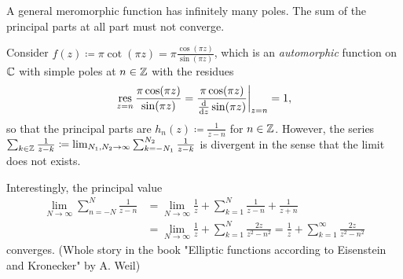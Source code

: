 \documentclass[a4paper,english]{article}
\begin{document}
A general meromorphic function has infinitely many poles.
The sum of the principal parts at all part must not converge.

\begin{exampleB}
    Consider $f(z) \coloneqq \pi \cot(\pi z) = \pi \frac{\cos(\pi z)}{\sin(\pi z)}$, which is an \emph{automorphic} function on $\operatorname{\mathbb{C}}$ with simple poles at $n \in \operatorname{\mathbb{Z}}$ with the residues
    \begin{equation*}
        \operatorname*{res}_{z = n} \frac{\pi \cos(\pi z)}{\sin(\pi z)}
        = \frac{\pi \cos(\pi z)}{\frac{\mathop{}\!\mathrm{d}}{\mathop{}\!\mathrm{d}{z}}\sin(\pi z)}\bigg|_{z = n}
        = 1,
    \end{equation*}
    so that the principal parts are $h_n(z) \coloneqq \frac{1}{z - n}$ for $n \in \operatorname{\mathbb{Z}}$.
    However, the series $\sum_{k \in \operatorname{\mathbb{Z}}} \frac{1}{z - k} \coloneqq \lim_{N_1, N_2 \to \infty} \sum_{k = -N_1}^{N_2} \frac{1}{z - k}$ is divergent in the sense that the limit does not exists.
    
    Interestingly, the principal value
    \begin{align*}
        \lim_{N \to \infty} \sum_{n = - N}^{N} \frac{1}{z - n}
        & = \lim_{N \to \infty} \frac{1}{z} + \sum_{k = 1}^{N} \frac{1}{z - n} + \frac{1}{z + n} \\
        & = \lim_{N \to \infty} \frac{1}{z} + \sum_{k = 1}^{N} \frac{2 z}{z^2 - n^2}
        = \frac{1}{z} + \sum_{k = 1}^{\infty} \frac{2 z}{z^2 - n^2}
    \end{align*}
    converges. (Whole story in the book "Elliptic functions according to Eisenstein and Kronecker" by A. Weil)
    

\end{exampleB}
\end{document}
